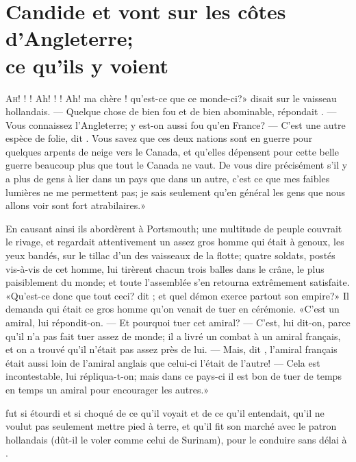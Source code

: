 \chapter[Candide et \bname{Martin} vont sur les côtes…]{Candide et  vont sur les côtes d’Angleterre;\\ ce qu’ils y voient}


\lettrine[ante=«]{A}{h! !} ! Ah! ! ! Ah! ma chère !
qu’est-ce que ce monde-ci?» disait  sur le vaisseau hollandais.
— Quelque chose de bien fou et de bien abominable, répondait . — Vous
connaissez l’Angleterre; y est-on aussi fou qu’en France? — C’est une
autre espèce de folie, dit . Vous savez que ces deux nations sont
en guerre pour quelques arpents de neige vers le Canada, et qu’elles
dépensent pour cette belle guerre beaucoup plus que tout le Canada ne
vaut. 
De vous dire précisément s’il y a plus de gens à lier dans un
pays que dans un autre, c’est ce que mes faibles lumières ne me
permettent pas; je sais seulement qu’en général les gens que nous
allons voir sont fort atrabilaires.»


En causant ainsi ils abordèrent à Portsmouth; une multitude de peuple
couvrait le rivage, et regardait attentivement un assez gros homme qui
était à genoux, les yeux bandés, sur le tillac d’un des vaisseaux de la
flotte; quatre soldats, postés vis-à-vis de cet homme, lui tirèrent
chacun trois balles dans le crâne, le plus paisiblement du monde; et
toute l’assemblée s’en retourna extrêmement satisfaite. «Qu’est-ce
donc que tout ceci? dit ; et quel démon exerce partout son
empire?» Il demanda qui était ce gros homme qu’on venait de tuer en
cérémonie.
«C’est un amiral, lui répondit-on. — Et pourquoi tuer cet
amiral? — C’est, lui dit-on, parce qu’il n’a pas fait tuer assez de monde;
il a livré un combat à un amiral français, et on a trouvé qu’il n’était
pas assez près de lui. — Mais, dit , l’amiral français était aussi
loin de l’amiral anglais que celui-ci l’était de l’autre! — Cela est
incontestable, lui répliqua-t-on; mais dans ce pays-ci il est bon de
tuer de temps en temps un amiral pour encourager les autres.»


 fut si étourdi et si choqué de ce qu’il voyait et de ce qu’il
entendait, qu’il ne voulut pas seulement mettre pied à terre, et qu’il
fit son marché avec le patron hollandais (dût-il le voler comme celui
de Surinam), pour le conduire sans délai à  .

